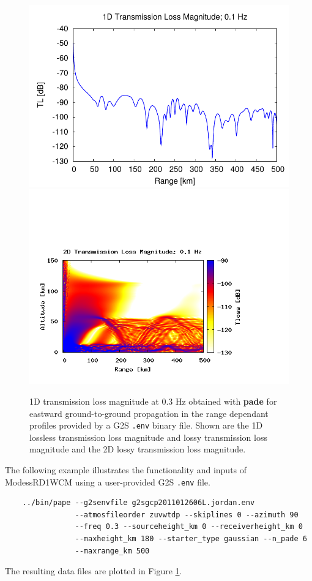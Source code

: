\begin{figure}[h]
\begin{center}
\includegraphics[scale=0.60]{figs/pade_ex1_1d}
\includegraphics[scale=0.45,trim = 20 20 110 140,clip]{figs/pade_ex1_2d.png}
\end{center}
\caption{1D transmission loss magnitude at 0.3 Hz obtained with {\bf pade} for eastward ground-to-ground propagation in the range dependant profiles provided by a G2S {\tt .env} binary file. Shown are the 1D lossless transmission loss magnitude and lossy transmission loss magnitude and the 2D lossy transmission loss magnitude.}
\label{fig: pade ex1}
\end{figure}

The following example illustrates the functionality and inputs of ModessRD1WCM using a user-provided G2S {\tt .env} file. 
\begin{verbatim}
    ../bin/pape --g2senvfile g2sgcp2011012606L.jordan.env 
                --atmosfileorder zuvwtdp --skiplines 0 --azimuth 90 
                --freq 0.3 --sourceheight_km 0 --receiverheight_km 0 
                --maxheight_km 180 --starter_type gaussian --n_pade 6 
                --maxrange_km 500
\end{verbatim}
The resulting data files are plotted in Figure \ref{fig: pade ex1}. 


